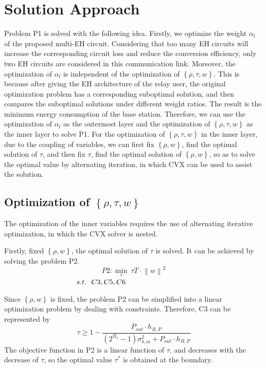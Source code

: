 \documentclass[conference]{IEEEtran}
\begin{document}
\section{Solution Approach}
Problem P1 is solved with the following idea. Firstly, we optimize the weight $\alpha _{l}$ of the proposed multi-EH circuit. Considering that too many EH circuits will increase the corresponding circuit loss and reduce the conversion efficiency, only two EH circuits are considered in this communication link. Moreover, the optimization of $\alpha _{l}$ is independent of the optimization of $\left \{ \rho ,\tau ,w \right \}$. This is because after giving the EH architecture of the relay user, the original optimization problem has a corresponding suboptimal solution, and then compares the suboptimal solutions under different weight ratios. The result is the minimum energy consumption of the base station. Therefore, we can use the optimization of $\alpha _{l}$ as the outermost layer and the optimization of $\left \{ \rho ,\tau ,w \right \}$ as the inner layer to solve P1. For the optimization of $\left \{ \rho ,\tau ,w \right \}$ in the inner layer, due to the coupling of variables, we can first fix $\left \{ \rho ,w \right \}$, find the optimal solution of $\tau$, and then fix $\tau$, find the optimal solution of $\left \{ \rho ,w \right \}$, so as to solve the optimal value by alternating iteration, in which CVX can be used to assist the solution.

\subsection{Optimization of $\left \{ \rho,\tau,w \right \}$}\label{BB}
The optimization of the inner variables requires the use of alternating iterative optimization, in which the CVX solver is nested.

Firstly, fixed $\left \{ \rho ,w \right \}$, the optimal solution of $\tau$ is solved. It can be achieved by solving the problem P2.
$$P2:\underset{\tau}{\min} \ \tau T\cdot \left \| w \right \|^{2}$$
$\qquad \qquad \qquad \qquad \qquad  s.t.\ \ \notag{C3},  \notag{C5},  \notag{C6}$

Since $\left \{ \rho ,w \right \}$ is fixed, the problem P2 can be simplified into a linear optimization problem by dealing with constraints. Therefore, C3 can be represented by 
\begin{equation}\label{eqn-1}
\tau \ge1- \frac{P_{out} \cdot h_{R,P} }{\left ( 2^{R_{1} }-1  \right )\sigma _{b,m}^{2}+P_{out} \cdot h_{R,P}  }
\end{equation}  
The objective function in P2 is a linear function of $\tau$, and decreases with the decrease of $\tau$, so the optimal value $\tau ^{\ast }$ is obtained at the boundary.
\end{document}
